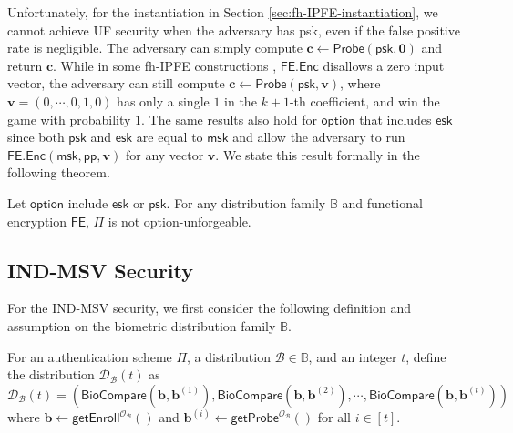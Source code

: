 Unfortunately, for the instantiation in Section \ref{sec:fh-IPFE-instantiation}, we cannot achieve UF security when the adversary has \textsf{psk}, even if the false positive rate is negligible. The adversary can simply compute $\mathbf{c} \gets \textsf{Probe}(\textsf{psk}, \mathbf{0})$ and return $\mathbf{c}$. While in some fh-IPFE constructions \cite{cryptoeprint:2015/1255, cryptoeprint:2016/440}, $\textsf{FE.Enc}$ disallows a zero input vector, the adversary can still compute $\mathbf{c} \gets \textsf{Probe}(\textsf{psk}, \mathbf{v})$, where $\mathbf{v} = (0, \cdots, 0, 1, 0)$ has only a single $1$ in the $k+1$-th coefficient, and win the game with probability $1$. The same results also hold for $\textsf{option}$ that includes $\textsf{esk}$ since both $\textsf{psk}$ and $\textsf{esk}$ are equal to $\textsf{msk}$ and allow the adversary to run $\textsf{FE.Enc}(\textsf{msk}, \textsf{pp}, \mathbf{v})$ for any vector $\mathbf{v}$. We state this result formally in the following theorem.

\begin{theorem}

Let $\textsf{option}$ include $\textsf{esk}$ or $\textsf{psk}$. For any distribution family $\mathbb{B}$ and functional encryption $\textsf{FE}$, $\Pi$ is not \textsf{option}-unforgeable.

\end{theorem}




\subsection{IND-MSV Security}
\label{sec:security_analysis:fh-IPFE:IND-MSV}

For the IND-MSV security, we first consider the following definition and assumption on the biometric distribution family $\mathbb{B}$.

\begin{definition}
For an authentication scheme $\Pi$, a distribution $\mathcal{B} \in \mathbb{B}$, and an integer $t$, define the distribution $\mathcal{D}_\mathcal{B}(t)$ as
\[
	\mathcal{D}_\mathcal{B}(t) = \left( \textsf{BioCompare}(\mathbf{b}, \mathbf{b}^{(1)}), \textsf{BioCompare}(\mathbf{b}, \mathbf{b}^{(2)}), \cdots, \textsf{BioCompare}(\mathbf{b}, \mathbf{b}^{(t)}) \right)
\]
where $\mathbf{b} \gets \textsf{getEnroll}^{\mathcal{O}_\mathcal{B}}()$ and $ \mathbf{b}^{(i)} \gets \textsf{getProbe}^{\mathcal{O}_\mathcal{B}}()$ for all $i \in [t]$.

\end{definition}


